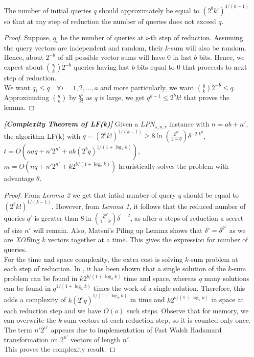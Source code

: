 \documentclass{article}
\begin{document}
   \begin{lemma}
   	The number of initial queries $q$ should approximately  be equal to $(2^b k!)^{{1}/(k-1)}$ so that at any step of reduction the number of queries does not exceed $q$.
   \end{lemma}
 
  \begin{proof}
  	Suppose, $q_i$ be the number of queries at $i$-th step of reduction. Assuming the query vectors are independent and random, their $k$-sum will also be random. Hence, about $2^{-b}$ of all possible vector sums will have $0$ in last $b$ bits. Hence, we expect about $\binom{q_i}{k}2^{-b}$ queries having last $b$ bits equal to $0$ that proceeds to next step of reduction. \\
  	
    We want $q_i\leq q\quad \forall i=1,2,...,a$ and more particularly, we want $\binom{q}{k}2^{-b}\leq q$. Approximating $\binom{q}{k}$ by $\frac{q^k}{k!}$ as $q$ is large, we get $q^{k-1}\leq 2^b k!$ that proves the lemma.
  \end{proof}

  \begin{theorem}\emph{\textbf{[Complexity Theorem of LF(k)]}}
  	Given a $LPN_{s,n,\tau}$ instance with $n=ab+{n'}$, the algorithm LF(k) with $q=(2^bk!)^{{1}/(k-1)}\geq 8\ln(\frac{2^{n'}}{1-\theta})\delta^{-2.k^{a}}$, $t=O(naq+n'2^{n'}+ak(2^bq)^{1/(1+\log_2k)})$, $m=O(nq+n'2^{n'}+k2^{b/(1+\log_2k)})$ heuristically solves the problem with advantage $\theta$.
  \end{theorem}

   \begin{proof}
   	From \emph{Lemma 2} we get that intial number of query $q$ should be equal to $(2^bk!)^{1/(k-1)}$. However, from \emph{Lemma 1}, it follows that the reduced number of queries $q'$ is greater than $8\ln(\frac{2^{n'}}{1-\theta})\delta^{'-2}$, as after $a$ steps of reduction a secret of size $n'$ will remain. Also, Matsui's Piling up Lemma \cite{LF} shows that $\delta'=\delta^{k^{a}}$ as we are \emph{XOR}ing $k$ vectors together at a time. This gives the expression for number of queries.\\
   	For the time and space complexity, the extra cost is solving $k$-sum problem at each step of reduction. In \cite{Ksum}, it has been shown that a single solution of the $k$-sum problem can be found in $k2^{b/(1+\log_2k)}$ time and space, whereas $q$ many solutions can be found in $q^{1/(1+\log_2k)}$ times the work of a single solution. Therefore, this adds a complexity of $k(2^bq)^{1/(1+\log_2k)}$ in time and $k2^{b/(1+\log_2k)}$ in space at each reduction step and we have $O(a)$ such steps. Observe that for memory, we can overwrite the $k$-sum vectors at each reduction step, so it is counted only once. The term $n'2^{n'}$ appears due to implementation of Fast Walsh Hadamard transformation on $2^{n'}$ vectors of length $n'$.\\
   	This proves the complexity result.
   \end{proof}
 
\end{document}
